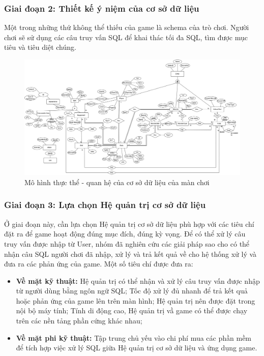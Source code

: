 \subsubsection{Giai đoạn 2: Thiết kế ý niệm của cơ sở dữ liệu}
\hspace*{0.5cm} Một trong những thứ không thể thiếu của game là schema của trò chơi. Người chơi sẽ sử dụng các câu truy vấn SQL để khai thác tối đa SQL, tìm được mục tiêu và tiêu diệt chúng.
\begin{figure}[H]
	\centering
	\includegraphics[width=\textwidth]{Images/eerd.jpg}
	\vspace{0.5cm}
	\caption{Mô hình thực thể - quan hệ của cơ sở dữ liệu của màn chơi}
\end{figure}

\subsubsection{Giai đoạn 3: Lựa chọn Hệ quản trị cơ sở dữ liệu}
\hspace*{0.5cm} Ở giai đoạn này, cần lựa chọn Hệ quản trị cơ sở dữ liệu phù hợp với các tiêu chí đặt ra để game hoạt động đúng mục đích, đúng kỳ vọng. Để có thể xử lý câu truy vấn được nhập từ User, nhóm đã nghiên cứu các giải pháp sao cho có thể nhận câu SQL người chơi đã nhập, xử lý và trả kết quả về cho hệ thống xử lý và đưa ra các phản ứng của game. Một số tiêu chí được đưa ra:
\begin{itemize}
	\item \textbf{Về mặt kỹ thuật: } Hệ quản trị có thể nhận và xử lý câu truy vấn được nhập từ người dùng bằng ngôn ngữ SQL; Tốc độ xử lý đủ nhanh để trả kết quả hoặc phản ứng của game lên trên màn hình; Hệ quản trị nên được đặt trong nội bộ máy tính; Tính di động cao, Hệ quản trị vầ game có thể được chạy trên các nền tảng phần cứng khác nhau;
	\item \textbf{Về mặt phi kỹ thuật: } Tập trung chủ yếu vào chi phí mua các phần mềm để tích hợp việc xử lý SQL giữa Hệ quản trị cơ sở dữ liệu và ứng dụng game. 
\end{itemize}

